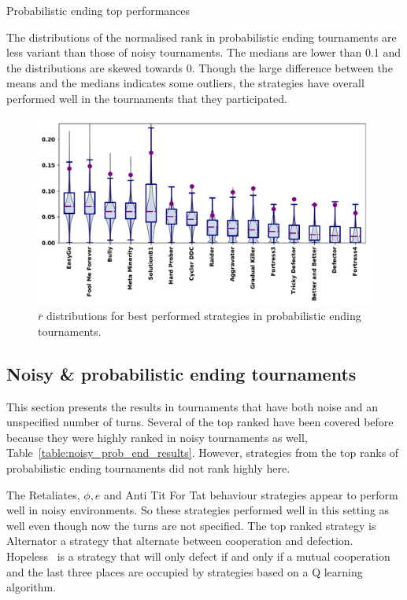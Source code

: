 \documentclass{article}
\begin{document}
\begin{table}[!htbp]
    \centering
    \resizebox{.25\textwidth}{!}{
    }
    \caption{Probabilistic ending top performances}\label{table:prob_end_results}
\end{table}

The distributions of the normalised rank in probabilistic ending tournaments are
less variant than those of noisy tournaments. The medians are lower than 0.1 and the
distributions are skewed towards 0. Though the large difference between the means
and the medians indicates some outliers, the strategies have overall performed
well in the tournaments that they participated.

\begin{figure}[!htbp]
    \centering
    \includegraphics[width=.8\textwidth]{../images/performance_probend.pdf}
    \caption{\(\bar{r}\) distributions for best performed strategies in probabilistic ending tournaments.}
    \label{fig:probend_results}
\end{figure}

\subsection{Noisy \& probabilistic ending tournaments}\label{subsection:noisy_probend_tournament}

This section presents the results in tournaments that have both noise and an
unspecified number of turns. Several of the top ranked have been covered before
because they were highly ranked in noisy tournaments as well,
Table~\ref{table:noisy_prob_end_results}. However, strategies from the
top ranks of probabilistic ending tournaments did not rank highly here.

The Retaliates, $\phi, e$ and Anti Tit For Tat behaviour strategies appear to
perform well in noisy environments. So these strategies performed well in this
setting as well even though now the turns are not specified. The top ranked
strategy is Alternator a strategy that alternate between cooperation and
defection. Hopeless~\cite{Van2015} is a strategy that will only defect if and
only if a mutual cooperation and the last three places are occupied by
strategies based on a Q learning algorithm.
\end{document}

